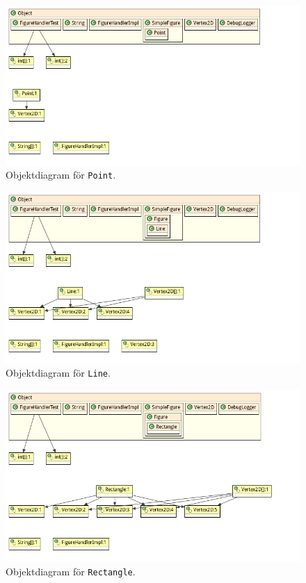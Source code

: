 \begin{figure}[ht]
\centering
\includegraphics[width=\linewidth]{diagram/figureHandlerTest_Point_Object-Diagram.png}
\caption{Objektdiagram för \texttt{Point}.  
}
\label{fig:obj-point}
\end{figure}

\begin{figure}[ht]
\centering
\includegraphics[width=\linewidth]{diagram/figureHandlerTest_Line_Object-Diagram.png}
\caption{Objektdiagram för \texttt{Line}.  
}
\label{fig:obj-line}
\end{figure}

\begin{figure}[ht]
\centering
\includegraphics[width=\linewidth]{diagram/figureHandlerTest_Rectangle_Object-Diagram.png}
\caption{Objektdiagram för \texttt{Rectangle}.
}
\label{fig:obj-rect}
\end{figure}

